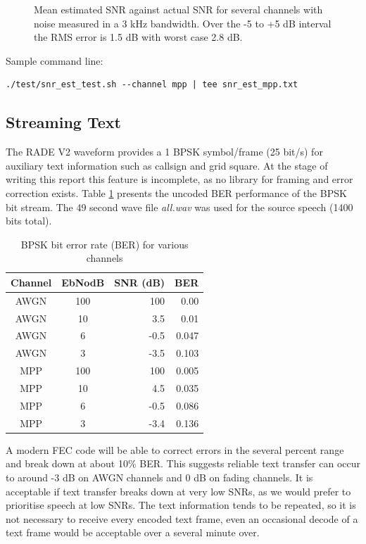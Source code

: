 \documentclass{article}
\begin{document}
\begin{figure}[H]
\caption{Mean estimated SNR against actual SNR for several channels with noise measured in a 3 \si{kHz} bandwidth. Over the -5 to +5 dB interval the RMS error is 1.5 \si{dB} with worst case 2.8 \si{dB}.}
\label{fig:v2_snr_est}
\begin{center}
\end{center}
\end{figure}

Sample command line:
\begin{verbatim}
./test/snr_est_test.sh --channel mpp | tee snr_est_mpp.txt
\end{verbatim}

\subsection{Streaming Text}

The RADE V2 waveform provides a 1 BPSK symbol/frame (25 bit/s) for auxiliary text information such as callsign and grid square.  At the stage of writing this report this feature is incomplete, as no library for framing and error correction exists.  Table \ref{tab:bpsk_ber} presents the uncoded BER performance of the BPSK bit stream.  The 49 second wave file \emph{all.wav} was used for the source speech (1400 bits total).
 
\begin{table} [h]
\caption{BPSK bit error rate (BER) for various channels}
\label{tab:bpsk_ber}
\centering
\begin{tabular}{ c | c | r | r }
 \hline
 Channel & EbNodB & SNR (\si{dB}) & BER \\
 \hline
 AWGN & 100 & 100 & 0.00 \\
 AWGN & 10 & 3.5 & 0.01 \\
 AWGN & 6 & -0.5 & 0.047 \\
 AWGN & 3 & -3.5 & 0.103 \\
 MPP & 100 & 100 & 0.005 \\
 MPP & 10 & 4.5 & 0.035 \\
 MPP & 6 & -0.5 & 0.086 \\
 MPP & 3 & -3.4 & 0.136 \\
 \hline
\end{tabular}
\end{table}

A modern FEC code will be able to correct errors in the several percent range and break down at about 10\% BER. This suggests reliable text transfer can occur to around -3 \si{dB} on AWGN channels and 0 \si{dB} on fading channels.  It is acceptable if text transfer breaks down at very low SNRs, as we would prefer to prioritise speech at low SNRs. The text information tends to be repeated, so it is not necessary to receive every encoded text frame, even an occasional decode of a text frame would be acceptable over a several minute over. 
\end{document}
